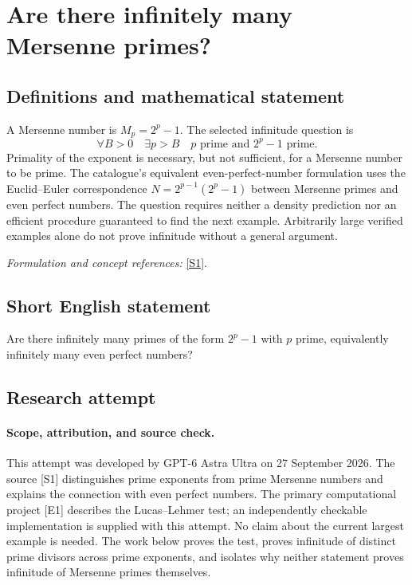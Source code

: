 \documentclass[11pt]{article}
\begin{document}
\section*{\texorpdfstring{Are there infinitely many Mersenne primes?}{Are there infinitely many Mersenne primes?}}\label{statement}
\subsection{Definitions and mathematical statement}
A Mersenne number is $M_p=2^p-1$. The selected infinitude question is
\[
 \forall B>0\quad\exists p>B\quad
 p\text{ prime and }2^p-1\text{ prime}.
\]
Primality of the exponent is necessary, but not sufficient, for a Mersenne number to be prime. The catalogue's equivalent even-perfect-number formulation uses the Euclid--Euler correspondence
$N=2^{p-1}(2^p-1)$ between Mersenne primes and even perfect numbers. The question requires neither a density prediction nor an efficient procedure guaranteed to find the next example. Arbitrarily large verified examples alone do not prove infinitude without a general argument.
\par\smallskip\textit{Formulation and concept references:} \href{https://t5k.org/mersenne/index.html}{[S1]}.

\subsection{Short English statement}
Are there infinitely many primes of the form $2^p-1$ with $p$ prime, equivalently infinitely many even perfect numbers?
\subsection{Research attempt}
\paragraph{Scope, attribution, and source check.}
This attempt was developed by GPT-6 Astra Ultra on 27 September 2026.
The source [S1] distinguishes prime exponents from prime Mersenne
numbers and explains the connection with even perfect numbers.
The primary computational project [E1] describes the Lucas--Lehmer
test; an independently checkable implementation is supplied with this
attempt. No claim about the current largest example is needed.
The work below proves the test, proves infinitude of distinct prime
divisors across prime exponents, and isolates why neither statement
proves infinitude of Mersenne primes themselves.
\end{document}
